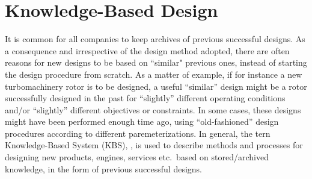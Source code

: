 \chapter{Knowledge-Based Design} %

\ifpdf
    \graphicspath{{3/figures/PNG/}{3ures/PDF/}{2.5/figures/}}
\else
    \graphicspath{{3/figures/EPS/}{3/figures/}}
\fi



\label{KBDchapter}
It is common for all companies to keep archives of previous successful designs. As a consequence and irrespective of the design method adopted, there are often reasons for new designs to be based on ``similar" previous ones, instead of starting the design procedure from scratch. As a matter of example, if for instance a new turbomachinery rotor is to be designed, a useful ``similar'' design might be a rotor successfully  designed in the past for ``slightly'' different operating conditions and/or ``slightly'' different objectives or constraints. 
In some cases, these designs might have been performed enough time ago, using ``old-fashioned'' design procedures according to different paremeterizations. In general, the tern Knowledge-Based System (KBS), \cite{Akerkar:2009:KS:1795845}, is used to describe methods and processes for designing new products, engines, services etc.\ based on stored/archived knowledge, in the form of previous successful designs.                

